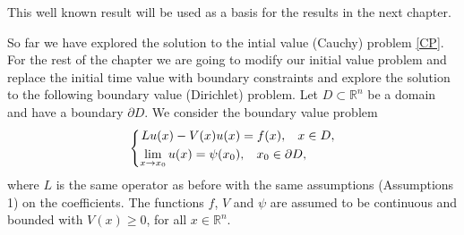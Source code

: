 \documentclass[a4paper,12pt,draft]{report}
\theoremstyle{remark}
\theoremstyle{definition}
\begin{document}
This well known result will be used as a basis for the results in the next chapter.

So far we have explored the solution to the intial value (Cauchy) problem \eqref{CP}.  For the rest of the chapter we are going to modify our initial value problem and replace the initial time value with boundary constraints and explore the solution to the following boundary value (Dirichlet) problem.  Let $D \subset \mathbb{R}^n$ be a domain and have a boundary $\partial D$.  We consider the boundary value problem
\begin{equation}
\left\{
\begin{aligned}
 Lu(x) - V(x)u(x) & = f(x), \hspace{0.3cm} x \in D,\\ 
\lim_{x \to x_0}u(x) = \psi(x_0) & , \hspace{0.3cm} x_0 \in \partial D, \label{DP}
\end{aligned}
\right.
\end{equation}
where $L$ is the same operator as before with the same assumptions (Assumptions 1) on the coefficients.  The functions $f$, $V$ and $\psi$ are assumed to be continuous and bounded with $V(x) \ge 0$, for all $x \in \mathbb{R}^n$.
\end{document}
